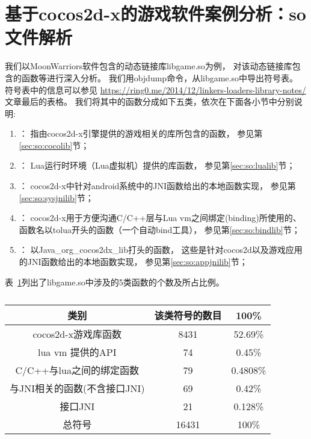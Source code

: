 \section{基于cocos2d-x的游戏软件案例分析：so文件解析}
\label{soanalysis}
我们以MoonWarriors软件包含的动态链接库libgame.so为例，
对该动态链接库包含的函数等进行深入分析。
我们用objdump命令，从libgame.so中导出符号表。
符号表中的信息可以参见
\url{https://ring0.me/2014/12/linkers-loaders-library-notes/}文章最后的表格。
我们将其中的函数分成如下五类，依次在下面各小节中分别说明:
\begin{enumerate}
\item {}：
	指由cocos2d-x引擎提供的游戏相关的库所包含的函数，
	参见第\ref{sec:so:cocolib}节；
\item {}：
	Lua运行时环境（Lua虚拟机）提供的库函数，
	参见第\ref{sec:so:lualib}节；
\item {}：
	cocos2d-x中针对android系统中的JNI函数给出的本地函数实现，
	参见第\ref{sec:so:sysjnilib}节；
\item {}：
	cocos2d-x用于方便沟通C/C++层与Lua vm之间绑定(binding)所使用的、
	函数名以tolua开头的函数（一个自动bind工具），
	参见第\ref{sec:so:bindlib}节；
\item {}：
	以Java\_org\_cocos2dx\_lib打头的函数，
	这些是针对cocos2d以及游戏应用的JNI函数给出的本地函数实现，
	参见第\ref{sec:so:appjnilib}节；
\end{enumerate}

表~\ref{table:so:fun}列出了libgame.so中涉及的5类函数的个数及所占比例。
\begin{table}[H]
\begin{center}
\caption{}
\label{table:so:fun}
\begin{tabular}{|c|c|c|}
\hline 类别 & 该类符号的数目 & 100\% \\
\hline cocos2d-x游戏库函数& 8431 & 52.69\%  \\
\hline  lua vm 提供的API & 74 & 0.45\% \\
\hline C/C++与lua之间的绑定函数 & 79 &  0.4808\% \\
\hline 与JNI相关的函数(不含接口JNI) & 69 & 0.42\%\\
\hline 接口JNI & 21 & 0.128\%\\
\hline 总符号 & 16431 & 100\%  \\
\hline
\end{tabular}
\end{center}
\end{table}

